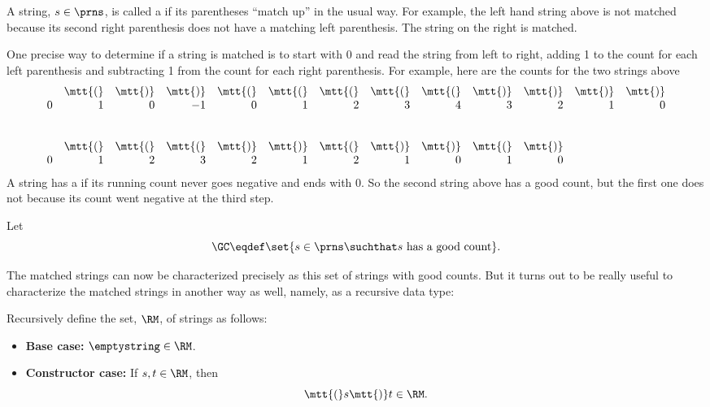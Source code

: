 A string, $s \in \prns$, is called a  if its
parentheses ``match up'' in the usual way.  For example, the left hand
string above is not matched because its second right parenthesis does not
have a matching left parenthesis.  The string on the right is matched.

One precise way to determine if a string is matched is to start with 0 and
read the string from left to right, adding 1 to the count for each left
parenthesis and subtracting 1 from the count for each right parenthesis.
For example, here are the counts for the two strings above
\[\begin{array}{rrrrrrrrrrrrr}
& \mtt{(} & \mtt{)} & \mtt{)} & \mtt{(} & \mtt{(} & \mtt{(} & \mtt{(} &
\mtt{(} & \mtt{)} & \mtt{)} & \mtt{)} & \mtt{)}\\
0 & 1 & 0 & -1 & 0 & 1 & 2 & 3 & 4 & 3 & 2 & 1 & 0\\
\\
\\
& \mtt{(} & \mtt{(} & \mtt{(} & \mtt{)} & \mtt{)} & \mtt{(} & \mtt{)} &
\mtt{)} & \mtt{(} & \mtt{)}\\
0 & 1 & 2 & 3 & 2 & 1 & 2 & 1 & 0 & 1 & 0
\end{array}\]
A string has a  if its running count never goes
negative and ends with 0.  So the second string above has a good count, but
the first one does not because its count went negative at the third step.
\begin{definition}\label{gc-def}
Let
\[
\GC \eqdef \set{ s \in \prns \suchthat s\ \text{has a good count}}.
\]
\end{definition}
The matched strings can now be characterized precisely as this set of
strings with good counts.  But it turns out to be really useful to
characterize the matched strings in another way as well, namely, as a
recursive data type:

\begin{definition}\label{RM-def}
Recursively define the set, $\RM$, of strings as follows:
\begin{itemize}

\item \textbf{Base case:} $\emptystring \in\RM$.

\item \textbf{Constructor case:} If $s,t \in\RM$, then
\[
\mtt{(}s\mtt{)}t \in\RM.
\]

\end{itemize}

\end{definition}

